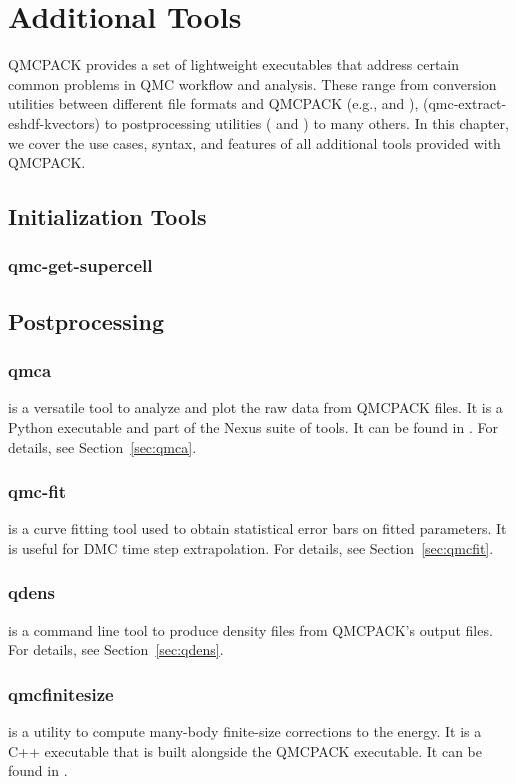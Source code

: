 \chapter{Additional Tools}
\label{chap:additional_tools}
QMCPACK provides a set of lightweight executables that address certain
common problems in QMC workflow and analysis.  These range from conversion utilities between 
different file formats and QMCPACK (e.g.,  and ),  
(qmc-extract-eshdf-kvectors) to postprocessing utilities ( and ) to many others.  In this chapter, we cover the use cases, syntax, and features of all additional tools provided with QMCPACK.  

\section{Initialization Tools}
  \subsection{qmc-get-supercell}

\section{Postprocessing}
  \subsection{qmca}
     is a versatile tool to analyze and plot the raw data from QMCPACK  files.
    It is a Python executable and part of the Nexus suite of tools.  It can be found in 
    . For details, see Section~\ref{sec:qmca}.
  \subsection{qmc-fit}
     is a curve fitting tool used to obtain statistical error bars on fitted parameters.
    It is useful for DMC time step extrapolation.  For details, see Section~\ref{sec:qmcfit}.
  \subsection{qdens}
     is a command line tool to produce density files from QMCPACK's  output files.  For details, see Section~\ref{sec:qdens}.
  \subsection{qmcfinitesize}
     is a utility to compute many-body finite-size corrections to the energy.  It
    is a C++ executable that is built alongside the QMCPACK executable.  It can be found in 
    .

